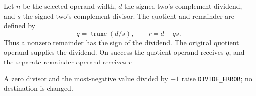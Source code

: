 Let \(n\) be the selected operand width, \(d\) the signed two's-complement dividend, and \(s\) the signed two's-complement divisor. The quotient and remainder are defined by
\[
  q = \operatorname{trunc}(d/s),
  \qquad r = d - qs .
\]
Thus a nonzero remainder has the sign of the dividend. The original quotient operand supplies the dividend. On success the quotient operand receives \(q\), and the separate remainder operand receives \(r\).

A zero divisor and the most-negative value divided by \(-1\) raise \texttt{DIVIDE\_ERROR}; no destination is changed.
